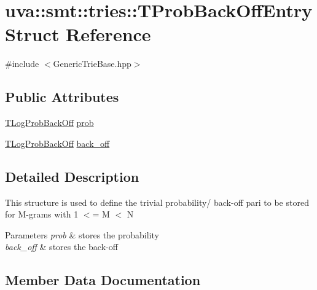 \hypertarget{structuva_1_1smt_1_1tries_1_1_t_prob_back_off_entry}{}\section{uva\+:\+:smt\+:\+:tries\+:\+:T\+Prob\+Back\+Off\+Entry Struct Reference}
\label{structuva_1_1smt_1_1tries_1_1_t_prob_back_off_entry}


{\ttfamily \#include $<$Generic\+Trie\+Base.\+hpp$>$}

\subsection*{Public Attributes}
\begin{DoxyCompactItemize}
\item 
\hyperlink{namespaceuva_1_1smt_1_1tries_acd0660255dd9ef5d644f01de49102750}{T\+Log\+Prob\+Back\+Off} \hyperlink{structuva_1_1smt_1_1tries_1_1_t_prob_back_off_entry_a214a33956ad703bd35a5aa83f99f7b92}{prob}
\item 
\hyperlink{namespaceuva_1_1smt_1_1tries_acd0660255dd9ef5d644f01de49102750}{T\+Log\+Prob\+Back\+Off} \hyperlink{structuva_1_1smt_1_1tries_1_1_t_prob_back_off_entry_acd9e9871fbaf91450225855e5c510145}{back\+\_\+off}
\end{DoxyCompactItemize}


\subsection{Detailed Description}
This structure is used to define the trivial probability/ back-\/off pari to be stored for M-\/grams with 1 $<$= M $<$ N 
\begin{DoxyParams}{Parameters}
{\em prob} & stores the probability \\
\hline
{\em back\+\_\+off} & stores the back-\/off \\
\hline
\end{DoxyParams}


\subsection{Member Data Documentation}
\hypertarget{structuva_1_1smt_1_1tries_1_1_t_prob_back_off_entry_acd9e9871fbaf91450225855e5c510145}{}
